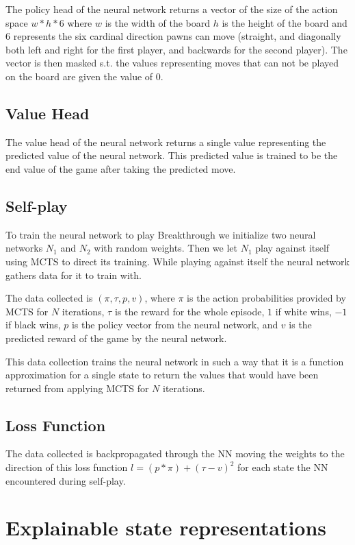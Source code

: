 The policy head of the neural network returns a vector of the size of the action space $w * h * 6$ where $w$ is the width of the board $h$ is the height of the board and $6$ represents the six cardinal direction pawns can move (straight, and diagonally both left and right for the first player, and backwards for the second player). The vector is then masked s.t. the values representing moves that can not be played on the board are given the value of $0$.

\subsection{Value Head}

The value head of the neural network returns a single value representing the predicted value of the neural network. This predicted value is trained to be the end value of the game after taking the predicted move.

\subsection{Self-play}

To train the neural network to play Breakthrough we initialize two neural networks $N_1$ and $N_2$ 
with random weights. Then we let $N_1$ play against itself using MCTS to direct its training. 
While playing against itself the neural network gathers data for it to train with. 

The data collected is $(\pi, \tau, p, v)$, where $\pi$ is the action probabilities provided by 
MCTS for $N$ iterations, $\tau$ is the reward for the whole episode, $1$ if white wins,
$-1$ if black wins, $p$ is the policy vector
from the neural network, and $v$ is the predicted reward of the game by the neural network.

This data collection trains the neural network in such a way that it is a function approximation for a single state to return the values that would have been returned from applying MCTS for $N$ iterations.


\subsection{Loss Function}

The data collected is backpropagated through the NN moving the weights to the direction of this 
loss function $l = (p * \pi) + (\tau - v)^2$ for each state the NN encountered during self-play.

\section{Explainable state representations}

